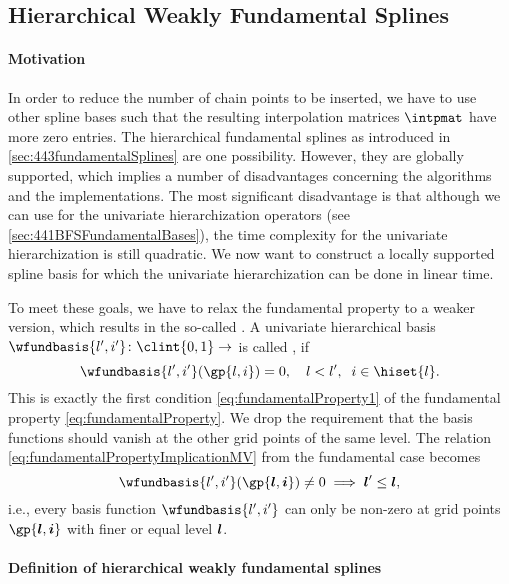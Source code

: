 \subsection{Hierarchical Weakly Fundamental Splines}
\label{sec:454wfs}

\paragraph{Motivation}

In order to reduce the number of chain points to be inserted,
we have to use other spline bases such that
the resulting interpolation matrices $\intpmat$ have more zero entries.
The hierarchical fundamental splines
as introduced in \cref{sec:443fundamentalSplines} are one possibility.
However, they are globally supported, which implies a number
of disadvantages concerning the algorithms and the implementations.
The most significant disadvantage is that although
we can use \bfs for the univariate hierarchization operators
(see \cref{sec:441BFSFundamentalBases}),
the time complexity for the univariate hierarchization is still quadratic.
We now want to construct a locally supported spline basis for which
the univariate hierarchization can be done in linear time.

To meet these goals, we have to relax the fundamental property
to a weaker version, which results in the so-called
.
A univariate hierarchical basis
$\wfundbasis{l',i'}\colon \clint{0, 1} \to \real$
is called , if
\begin{equation}
  \label{eq:weaklyFundamentalProperty}
  \wfundbasis{l',i'}(\gp{l,i}) = 0,\quad
  l < l',\;\;
  i \in \hiset{l}.
\end{equation}
This is exactly the first condition \eqref{eq:fundamentalProperty1}
of the fundamental property \eqref{eq:fundamentalProperty}.
We drop the requirement that the basis functions
should vanish at the other grid points of the same level.
The relation \eqref{eq:fundamentalPropertyImplicationMV} from the
fundamental case becomes
\begin{equation}
  \label{eq:weaklyFundamentalPropertyImplicationMV}
  \wfundbasis{l',i'}(\gp{\*l,\*i})
  \not= 0
  \implies
  \*l' \le \*l,
\end{equation}
i.e., every basis function $\wfundbasis{l',i'}$
can only be non-zero at grid points $\gp{\*l,\*i}$ with
finer or equal level ${\boldsymbol{l}}$.

\paragraph{Definition of hierarchical weakly fundamental splines}

